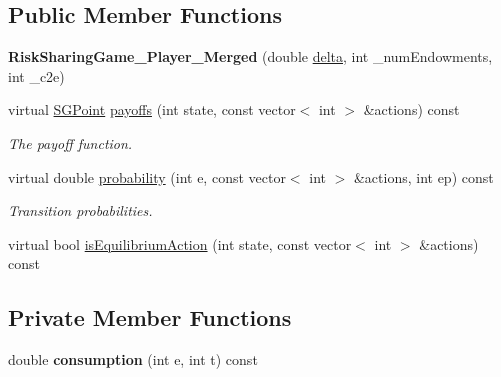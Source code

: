\subsection*{Public Member Functions}
\begin{DoxyCompactItemize}
\item 
\mbox{\label{classRiskSharingGame__3Player__Merged_a32094245f4ee1427cb306705b03249d9}} 
{\bfseries Risk\+Sharing\+Game\+\_\+Player\+\_\+\+Merged} (double \hyperlink{classSGAbstractGame_a34c8905ac463bb2ec54aba4eb4ac376f}{delta}, int \+\_\+num\+Endowments, int \+\_\+c2e)
\item 
virtual \hyperlink{classSGPoint}{S\+G\+Point} \hyperlink{classRiskSharingGame__3Player__Merged_aa1d807770ff356fe1114d17966172fbd}{payoffs} (int state, const vector$<$ int $>$ \&actions) const
\begin{DoxyCompactList}\small\item\em The payoff function. \end{DoxyCompactList}\item 
virtual double \hyperlink{classRiskSharingGame__3Player__Merged_a505d06e31a1cabde1c6fab8ac5af8409}{probability} (int e, const vector$<$ int $>$ \&actions, int ep) const
\begin{DoxyCompactList}\small\item\em Transition probabilities. \end{DoxyCompactList}\item 
virtual bool \hyperlink{classRiskSharingGame__3Player__Merged_aeff4f08e00ef46bbdbb190c9c6c393a4}{is\+Equilibrium\+Action} (int state, const vector$<$ int $>$ \&actions) const
\end{DoxyCompactItemize}
\subsection*{Private Member Functions}
\begin{DoxyCompactItemize}
\item 
\mbox{\label{classRiskSharingGame__3Player__Merged_a9d26ce7c0e2d6734f6501ae82d173e96}} 
double {\bfseries consumption} (int e, int t) const
\end{DoxyCompactItemize}
